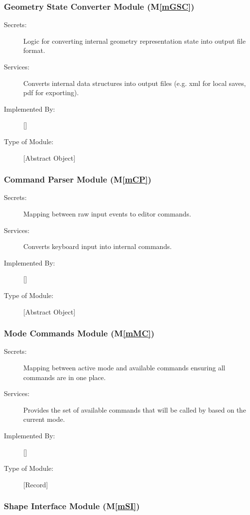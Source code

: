 \documentclass[12pt, titlepage]{article}
\newcommand{\mref}[1]{M\ref{#1}}
\begin{document}
\subsubsection{Geometry State Converter Module (\mref{mGSC})}

\begin{description}
\item[Secrets:]Logic for converting internal geometry representation state into output file format.
\item[Services:] Converts internal data structures into output files (e.g. xml for local saves, pdf for exporting).
\item[Implemented By:] [\progname{}]
\item[Type of Module:] [Abstract Object]
\end{description}

\subsubsection{Command Parser Module  (\mref{mCP})}

\begin{description}
\item[Secrets:]Mapping between raw input events to editor commands.
\item[Services:]Converts keyboard input into internal commands.
\item[Implemented By:] [\progname{}]
\item[Type of Module:] [Abstract Object]
\end{description}

\subsubsection{Mode Commands Module (\mref{mMC})}

\begin{description}
\item[Secrets:]Mapping between active mode and available commands ensuring all commands are in one place.
\item[Services:]Provides the set of available commands that will be called by  based on the current mode.
\item[Implemented By:] [\progname{}]
\item[Type of Module:] [Record]
\end{description}

\subsubsection{Shape Interface Module (\mref{mSI})}
\end{document}
